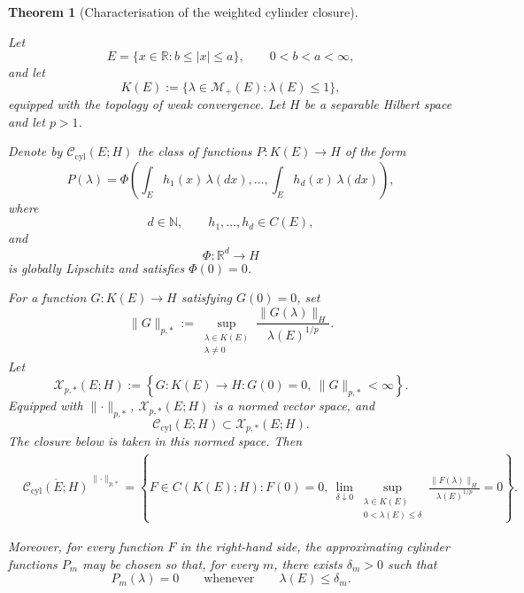 \documentclass[10pt,a4paper]{amsart}
\newtheorem{thm}{Theorem}
\begin{document}
\begin{thm}[Characterisation of the weighted cylinder closure]
\label{thm:weighted-cylinder-density}

Let
\[
        E=\{x\in\mathbb R:b\le |x|\le a\},
        \qquad 0<b<a<\infty,
\]
and let
\[
        K(E)
        :=
        \bigl\{
        \lambda\in\mathcal M_+(E):
        \lambda(E)\le1
        \bigr\},
\]
equipped with the topology of weak convergence. Let \(H\) be a
separable Hilbert space and let \(p>1\).

Denote by \(\mathcal C_{\mathrm{cyl}}(E;H)\) the class of functions
\(P:K(E)\to H\) of the form
\[
P(\lambda)
=
\Phi
\left(
        \int_E h_1(x)\,\lambda(dx),
        \ldots,
        \int_E h_d(x)\,\lambda(dx)
\right),
\]
where
\[
        d\in\mathbb N,
        \qquad
        h_1,\ldots,h_d\in C(E),
\]
and
\[
        \Phi:\mathbb R^d\longrightarrow H
\]
is globally Lipschitz and satisfies \(\Phi(0)=0\).

For a function \(G:K(E)\to H\) satisfying \(G(0)=0\), set
\[
\lVert G\rVert_{p,*}
:=
\sup_{\substack{\lambda\in K(E)\\\lambda\ne0}}
\frac{\lVert G(\lambda)\rVert_H}
     {\lambda(E)^{1/p}}.
\]
Let
\[
\mathcal X_{p,*}(E;H)
:=
\left\{
G:K(E)\to H:
G(0)=0,\
\lVert G\rVert_{p,*}<\infty
\right\}.
\]
Equipped with \(\lVert\cdot\rVert_{p,*}\),
\(\mathcal X_{p,*}(E;H)\) is a normed vector space, and
\[
        \mathcal C_{\mathrm{cyl}}(E;H)
        \subset
        \mathcal X_{p,*}(E;H).
\]
The closure below is taken in this normed space. Then
\[
\begin{aligned}
&
\overline{\mathcal C_{\mathrm{cyl}}(E;H)}
^{\,\lVert\cdot\rVert_{p,*}}
=
\left\{
F\in C(K(E);H):
F(0)=0,\
\lim_{\delta\downarrow0}
\sup_{\substack{\lambda\in K(E)\\
                 0<\lambda(E)\le\delta}}
\frac{\lVert F(\lambda)\rVert_H}
     {\lambda(E)^{1/p}}
=0
\right\}.
\end{aligned}
\]

Moreover, for every function \(F\) in the right-hand side, the
approximating cylinder functions \(P_m\) may be chosen so that, for
every \(m\), there exists \(\delta_m>0\) such that
\[
        P_m(\lambda)=0
        \qquad\text{whenever}\qquad
        \lambda(E)\le\delta_m.
\]
\end{thm}
\end{document}
